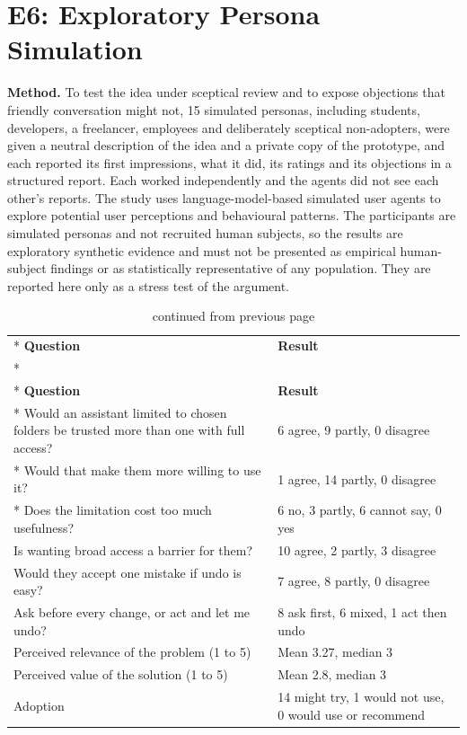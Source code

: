 \documentclass{FastFyp}
\begin{document}
\section{E6: Exploratory Persona Simulation}
\textbf{Method.} To test the idea under sceptical review and to expose objections that friendly conversation might not, 15 simulated personas, including students, developers, a freelancer, employees and deliberately sceptical non-adopters, were given a neutral description of the idea and a private copy of the prototype, and each reported its first impressions, what it did, its ratings and its objections in a structured report. Each worked independently and the agents did not see each other's reports. The study uses language-model-based simulated user agents to explore potential user perceptions and behavioural patterns. The participants are simulated personas and not recruited human subjects, so the results are exploratory synthetic evidence and must not be presented as empirical human-subject findings or as statistically representative of any population. They are reported here only as a stress test of the argument.

{
\begin{longtable}{|p{8.0cm}|p{5.2cm}|}
\caption{Persona simulation results.}\label{tab:sim}\\*
\hline
\textbf{Question} & \textbf{Result} \\*
\hline
\endfirsthead
\caption[]{continued from previous page}\\*
\hline
\textbf{Question} & \textbf{Result} \\*
\hline
\endhead
\hline
Would an assistant limited to chosen folders be trusted more than one with full access? & 6 agree, 9 partly, 0 disagree \\*
\hline
Would that make them more willing to use it? & 1 agree, 14 partly, 0 disagree \\*
\hline
Does the limitation cost too much usefulness? & 6 no, 3 partly, 6 cannot say, 0 yes \\
\hline
Is wanting broad access a barrier for them? & 10 agree, 2 partly, 3 disagree \\
\hline
Would they accept one mistake if undo is easy? & 7 agree, 8 partly, 0 disagree \\
\hline
Ask before every change, or act and let me undo? & 8 ask first, 6 mixed, 1 act then undo \\
\hline
Perceived relevance of the problem (1 to 5) & Mean 3.27, median 3 \\
\hline
Perceived value of the solution (1 to 5) & Mean 2.8, median 3 \\
\hline
Adoption & 14 might try, 1 would not use, 0 would use or recommend \\
\hline
\end{longtable}
}
\end{document}
